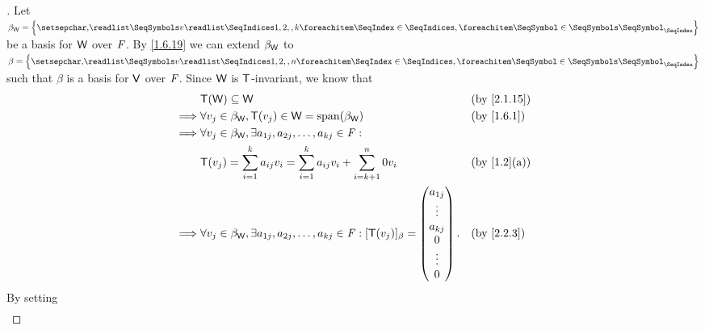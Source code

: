 \begin{proof}[]
  Let \(\beta_{\W} = \set{\seq{v}{1,2,,k}}\) be a basis for \(\mathsf{W}\) over \(\mathit{F}\).
  By \cref{1.6.19} we can extend \(\beta_{\mathsf{W}}\) to \(\beta = \set{\seq{v}{1,2,,n}}\) such that \(\beta\) is a basis for \(\mathsf{V}\) over \(\mathit{F}\).
  Since \(\mathsf{W}\) is \(\mathsf{T}\)-invariant, we know that
  \begin{align*}
             & \T(\W) \subseteq \W                                                                                               &  & \text{(by \cref{2.1.15})} \\
    \implies & \forall v_j \in \beta_{\W}, \T(v_j) \in \W = \spn{\beta_{\W}}                                                     &  & \text{(by \cref{1.6.1})}  \\
    \implies & \forall v_j \in \beta_{\W}, \exists a_{1 j}, a_{2 j}, \dots, a_{k j} \in \F :                                                                    \\
             & \T(v_j) = \sum_{i = 1}^k a_{i j} v_i = \sum_{i = 1}^k a_{i j} v_i + \sum_{i = k + 1}^n 0 v_i                      &  & \text{(by \cref{1.2}(a))} \\
    \implies & \forall v_j \in \beta_{\W}, \exists a_{1 j}, a_{2 j}, \dots, a_{k j} \in \F : [\T(v_j)]_{\beta} = \begin{pmatrix}
                                                                                                                   a_{1 j} \\
                                                                                                                   \vdots  \\
                                                                                                                   a_{k j} \\
                                                                                                                   0       \\
                                                                                                                   \vdots  \\
                                                                                                                   0
                                                                                                                 \end{pmatrix}. &  & \text{(by \cref{2.2.3})}
  \end{align*}
  By setting
  \begin{align*}

\end{align*}
\end{proof}
